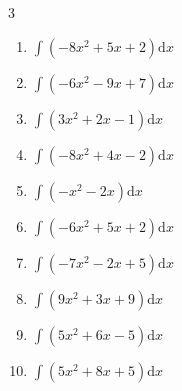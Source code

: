 \begin{multicols}{3}
\begin{enumerate}

\columnbreak %

  \item $\displaystyle \int \left( -8x^{2}+5x+2 \right) \mathrm{d}x$


  \item $\displaystyle \int \left( -6x^{2}-9x+7 \right) \mathrm{d}x$


  \item $\displaystyle \int \left( 3x^{2}+2x-1 \right) \mathrm{d}x$


  \item $\displaystyle \int \left( -8x^{2}+4x-2 \right) \mathrm{d}x$


  \item $\displaystyle \int \left( -x^{2}-2x \right) \mathrm{d}x$


  \item $\displaystyle \int \left( -6x^{2}+5x+2 \right) \mathrm{d}x$


  \item $\displaystyle \int \left( -7x^{2}-2x+5 \right) \mathrm{d}x$


  \item $\displaystyle \int \left( 9x^{2}+3x+9 \right) \mathrm{d}x$


  \item $\displaystyle \int \left( 5x^{2}+6x-5 \right) \mathrm{d}x$


  \item $\displaystyle \int \left( 5x^{2}+8x+5 \right) \mathrm{d}x$


\end{enumerate}
\end{multicols}
